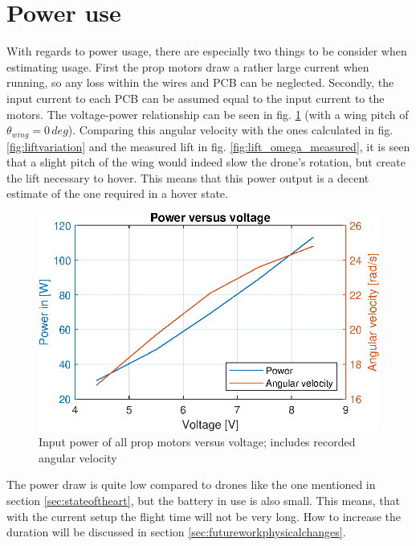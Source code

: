 \section{Power use} \label{sec:poweruse}
With regards to power usage, there are especially two things to be consider when estimating usage. First the prop motors draw a rather large current when running, so any loss within the wires and PCB can be neglected. Secondly, the input current to each PCB can be assumed equal to the input current to the motors. The voltage-power relationship can be seen in fig. \ref{fig:power} (with a wing pitch of $\theta_{wing} = 0 \,deg$). Comparing this angular velocity with the ones calculated in fig. \ref{fig:liftvariation} and the measured lift in fig. \ref{fig:lift_omega_measured}, it is seen that a slight pitch of the wing would indeed slow the drone's rotation, but create the lift necessary to hover. This means that this power output is a decent estimate of the one required in a hover state.\\
\begin{figure}[h!]
    \centering
    \includegraphics{figures/results/power_voltage.eps}
    \caption{Input power of all prop motors versus voltage; includes recorded angular velocity}
    \label{fig:power}
\end{figure}
The power draw is quite low compared to drones like the one mentioned in section \ref{sec:stateoftheart}, but the battery in use is also small. This means, that with the current setup the flight time will not be very long. How to increase the duration will be discussed in section \ref{sec:futureworkphysicalchanges}. 




